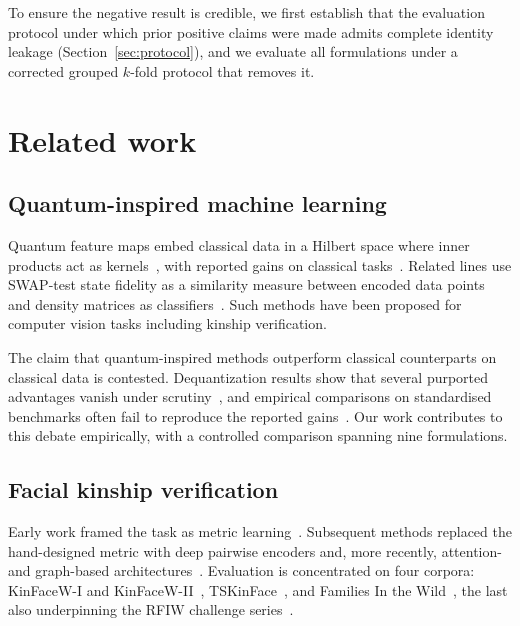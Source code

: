 \documentclass[preprint,12pt]{elsarticle}
\begin{document}
To ensure the negative result is credible, we first establish that the
evaluation protocol under which prior positive claims were made admits
complete identity leakage (Section~\ref{sec:protocol}), and we evaluate all
formulations under a corrected grouped $k$-fold protocol that removes it.

\section{Related work}
\label{sec:related}

\subsection{Quantum-inspired machine learning}

Quantum feature maps embed classical data in a Hilbert space where inner
products act as kernels~\cite{schuld2019quantum}, with reported gains on
classical tasks~\cite{havlicek2019supervised}. Related lines use SWAP-test
state fidelity as a similarity measure between encoded data
points~\cite{buhrman2001quantum} and density matrices as
classifiers~\cite{lloyd2020quantum}. Such methods have been proposed for
computer vision tasks including kinship verification.

The claim that quantum-inspired methods outperform classical counterparts on
classical data is contested. Dequantization results show that several
purported advantages vanish under scrutiny~\cite{tang2019quantum}, and
empirical comparisons on standardised benchmarks often fail to reproduce the
reported gains~\cite{bowles2024better}. Our work contributes to this debate
empirically, with a controlled comparison spanning nine formulations.

\subsection{Facial kinship verification}

Early work framed the task as metric learning~\cite{lu2014neighborhood}.
Subsequent methods replaced the hand-designed metric with deep pairwise
encoders and, more recently, attention- and graph-based
architectures~\cite{zhu2022kinship}. Evaluation is concentrated on four
corpora: KinFaceW-I and KinFaceW-II~\cite{lu2012kinfacew},
TSKinFace~\cite{qin2015tri}, and Families In the
Wild~\cite{robinson2018fiw}, the last also underpinning the RFIW challenge
series~\cite{robinson2020rfiw}.
\end{document}
